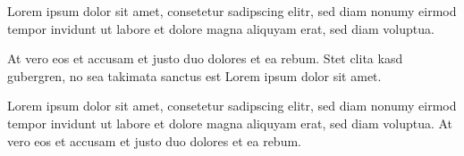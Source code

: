 \documentclass[11pt,ngerman,a4paper]{g-brief2}
\begin{document}
\begin{g-brief}

Lorem ipsum dolor sit amet, consetetur sadipscing elitr, sed diam nonumy eirmod 
tempor invidunt ut labore et dolore magna aliquyam erat, sed diam voluptua. 

At vero eos et accusam et justo duo dolores et ea rebum. Stet clita kasd 
gubergren, no sea takimata sanctus est Lorem ipsum dolor sit amet. 

Lorem ipsum dolor sit amet, consetetur sadipscing elitr, sed diam nonumy eirmod 
tempor invidunt ut labore et dolore magna aliquyam erat, sed diam voluptua. At 
vero eos et accusam et justo duo dolores et ea rebum.

\end{g-brief}
\end{document}
